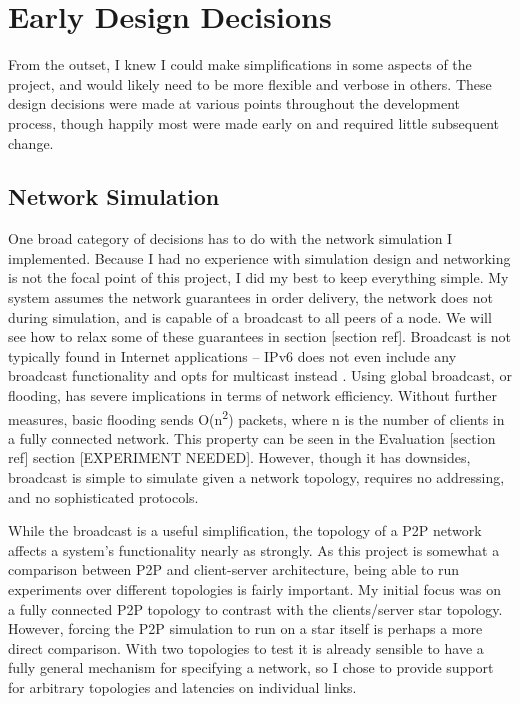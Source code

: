 \documentclass[12pt,a4paper,twoside,openright]{report}
\begin{document}
	
\section{Early Design Decisions}
From the outset, I knew I could make simplifications in some aspects of the project, and would likely need to be more flexible and verbose in others. These design decisions were made at various points throughout the development process, though happily most were made early on and required little subsequent change. 

	\subsection{Network Simulation}
	One broad category of decisions has to do with the network simulation I implemented. Because I had no experience with simulation design and networking is not the focal point of this project, I did my best to keep everything simple. My system assumes the network guarantees in order delivery, the network does not during simulation, and is capable of a broadcast to all peers of a node. We will see how to relax some of these guarantees in section [section ref]. Broadcast is not typically found in Internet applications – IPv6 does not even include any broadcast functionality and opts for multicast instead \cite{RFC2460}. Using global broadcast, or flooding, has severe implications in terms of network efficiency. Without further measures, basic flooding sends O(n\textsuperscript{2}) packets, where n is the number of clients in a fully connected network. This property can be seen in the Evaluation [section ref] section [EXPERIMENT NEEDED]. However, though it has downsides, broadcast is simple to simulate given a network topology, requires no addressing, and no sophisticated protocols.
	
	While the broadcast is a useful simplification, the topology of a P2P network affects a system's functionality nearly as strongly. As this project is somewhat a comparison between P2P and client-server architecture, being able to run experiments over different topologies is fairly important. My initial focus was on a fully connected P2P topology to contrast with the clients/server star topology. However, forcing the P2P simulation to run on a star itself is perhaps a more direct comparison. With two topologies to test it is already sensible to have a fully general mechanism for specifying a network, so I chose to provide support for arbitrary topologies and latencies on individual links. 
	
\end{document}
